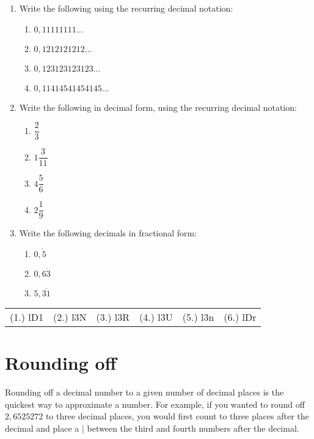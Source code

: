 \begin{exercises}{}
{\begin{enumerate}[itemsep=5pt, label=\textbf{\arabic*}. ]
% 
\item Write the following using the recurring decimal notation:
    \begin{enumerate}[itemsep=5pt, label=\textbf{(\alph*)} ] 
    \item $0,11111111\ldots$
    \item $0,1212121212\ldots$
    \item $0,123123123123\ldots$
    \item $0,11414541454145\ldots$
    \end{enumerate}
\item Write the following in decimal form, using the recurring decimal notation:
    \begin{enumerate}[itemsep=5pt, label=\textbf{(\alph*)} ] 
    \item $\dfrac{2}{3}$
    \item $1\dfrac{3}{11}$
    \item $4\dfrac{5}{6}$
    \item $2\dfrac{1}{9}$
    \end{enumerate}
\item Write the following decimals in fractional form:
    \begin{enumerate}[itemsep=5pt, label=\textbf{(\alph*)} ] 
    \item $0,\dot{5}$
    \item $0,6\dot{3}$
    \item $5,\overline{31}$
    \end{enumerate}
\end{enumerate}
\practiceinfo 
\par 
 \par \begin{tabular}[h]{cccccc}
 (1.) lD1  &  (2.) l3N  &  (3.) l3R  & (4.) l3U & (5.) l3n & (6.) lDr \end{tabular}
}
\end{exercises}

\section{Rounding off}
\nopagebreak
Rounding off a decimal number to a given number of decimal places is
the quickest way to approximate a number. For example, if you wanted
to round off $2,6525272$ to three decimal places, you would first
count to three places after the decimal and place a $|$ between the
third and fourth numbers after the decimal.\par 

